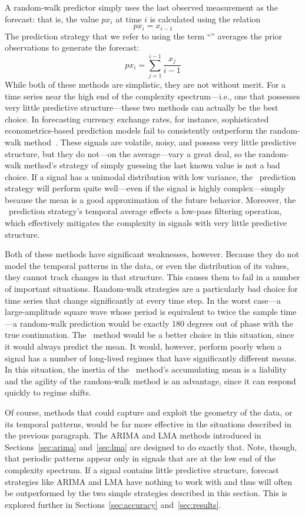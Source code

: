 A random-walk predictor simply uses the last observed measurement as
the forecast: that is, the value $px_i$ at time $i$ is calculated
using the relation $$px_i = x_{i-1}$$ The prediction strategy that we
refer to using the term ``\naive'' averages the prior observations to
generate the forecast: $$px_i = \sum_{j=1}^{i-1}\frac{x_j}{i-1}$$
While both of these methods are simplistic, they are not without
merit.  For a time series near the high end of the complexity
spectrum---i.e., one that possesses very little predictive
structure---these two methods can actually be the best choice.  In
forecasting currency exchange rates, for instance, sophisticated
econometrics-based prediction models fail to consistently outperform
the random-walk method~\cite{rwMeese,rwCCE}.  These signals are
volatile, noisy, and possess very little predictive structure, but
they do not---on the average---vary a great deal, so the random-walk
method's strategy of simply guessing the last known value is not a bad
choice.  If a signal has a unimodal distribution with low variance,
the \naive ~prediction strategy will perform quite well---even if the
signal is highly complex---simply because the mean is a good
approximation of the future behavior.  Moreover, the \naive
~prediction strategy's temporal average effects a low-pass filtering
operation, which effectively mitigates the complexity in signals with
very little predictive structure.

Both of these methods have significant weaknesses, however.  Because
they do not model the temporal patterns in the data, or even the
distribution of its values, they cannot track changes in that
structure.  This causes them to fail in a number of important
situations.  Random-walk strategies are a particularly bad choice for
time series that change significantly at every time step.  In the
worst case---a large-amplitude square wave whose period is equivalent
to twice the sample time---a random-walk prediction would be exactly
180 degrees out of phase with the true continuation.  The \naive
~method would be a better choice in this situation, since it would
always predict the mean.  It would, however, perform poorly when a
signal has a number of long-lived regimes that have significantly
different means.  In this situation, the inertia of the \naive
~method's accumulating mean is a liability and the agility of the
random-walk method is an advantage, since it can respond quickly to
regime shifts.

Of course, methods that could capture and exploit the geometry of the
data, or its temporal patterns, would be far more effective in the
situations described in the previous paragraph.  The ARIMA and LMA
methods introduced in Sections~\ref{sec:arima} and~\ref{sec:lma} are
designed to do exactly that.  Note, though, that periodic patterns
appear only in signals that are at the low end of the complexity
spectrum.  If a signal contains little predictive structure, forecast
strategies like ARIMA and LMA have nothing to work with and thus will
often be outperformed by the two simple strategies described in this
section.  This is explored further in Sections~\ref{sec:accuracy}
and~\ref{sec:results}.


